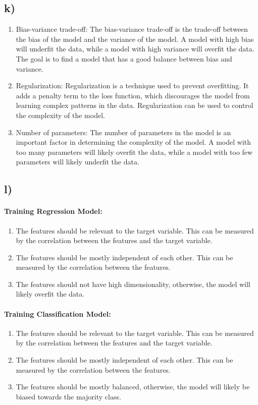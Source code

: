 \documentclass[a4paper,12pt]{article}
\begin{document}
\subsection*{k)}

\begin{enumerate}
	\item Bias-variance trade-off: The bias-variance trade-off is the trade-off between the bias of the model and the variance of the model. A model with high bias will underfit the data, while a model with high variance will overfit the data. The goal is to find a model that has a good balance between bias and variance.
	\item Regularization: Regularization is a technique used to prevent overfitting. It adds a penalty term to the loss function, which discourages the model from learning complex patterns in the data. Regularization can be used to control the complexity of the model.
	\item Number of parameters: The number of parameters in the model is an important factor in determining the complexity of the model. A model with too many parameters will likely overfit the data, while a model with too few parameters will likely underfit the data. 
\end{enumerate}

\subsection*{l)}

\paragraph{Training Regression Model:}
\begin{enumerate}
	\item The features should be relevant to the target variable. This can be measured by the correlation between the features and the target variable.
	\item The features should be mostly independent of each other. This can be measured by the correlation between the features.
	\item The features should not have high dimensionality, otherwise, the model will likely overfit the data.
\end{enumerate}

\paragraph{Training Classification Model:}
\begin{enumerate}
	\item The features should be relevant to the target variable. This can be measured by the correlation between the features and the target variable.
	\item The features should be mostly independent of each other. This can be measured by the correlation between the features.
	\item The features should be mostly balanced, otherwise, the model will likely be biased towards the majority class.
\end{enumerate}
\end{document}
